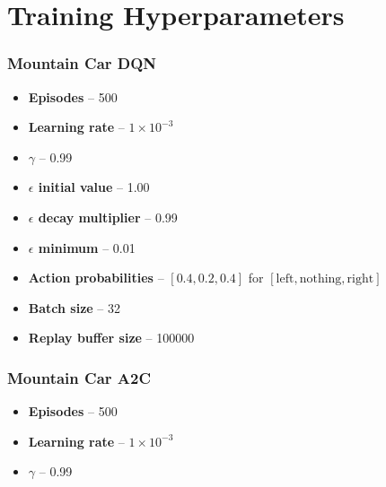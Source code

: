 \chapter{Training Hyperparameters} \label{chp:hyperparameters}
\subsection*{Mountain Car DQN}
\begin{itemize}
  \item \textbf{Episodes} -- 500
  \item \textbf{Learning rate} -- $1 \times 10^{-3}$
  \item \textbf{$\gamma$} -- 0.99

  \item \textbf{$\epsilon$ initial value} -- 1.00
  \item \textbf{$\epsilon$ decay multiplier} -- 0.99
  \item \textbf{$\epsilon$ minimum} -- 0.01
  \item \textbf{Action probabilities} -- $[0.4, 0.2, 0.4]$ for $\left[\text{left}, \text{nothing},
            \text{right}\right]$

  \item \textbf{Batch size} -- 32
  \item \textbf{Replay buffer size} -- 100000
\end{itemize}

\subsection*{Mountain Car A2C}
\begin{itemize}
  \item \textbf{Episodes} -- 500
  \item \textbf{Learning rate} -- $1 \times 10^{-3}$
  \item \textbf{$\gamma$} -- 0.99
\end{itemize}

\newpage


